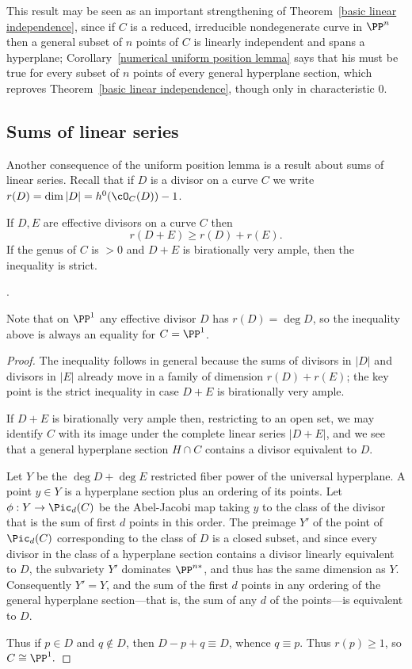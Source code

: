 This result may be seen as an important strengthening of Theorem~\ref{basic linear independence}, since if $C$ is a reduced, irreducible nondegenerate curve in $\PP^n$ then a general subset of $n$ points of $C$ is linearly independent and spans a hyperplane; Corollary~\ref{numerical uniform position lemma} says that his must
be true for every subset of $n$ points of every general hyperplane section, 
which reproves Theorem~\ref{basic linear independence}, though only in characteristic 0. 

\subsection{Sums of linear series}

Another consequence of the uniform position lemma is a result about sums of linear series.
Recall that if $D$ is a divisor on a curve $C$ we write $r(D) = \dim |D| = h^0(\cO_C(D))-1$.

\begin{corollary}\label{Clifford equality plus}
If $D,E$ are effective divisors on a curve $C$ then
$$
r(D+E) \geq r(D)+r(E).
$$
If the genus of $C$ is $>0$ and $D+E$ is birationally very ample, then the inequality is strict.
\end{corollary}.

Note that on $\PP^1$ any effective divisor $D$ has $r(D) = \deg D$, so the inequality above is
always an equality for $C = \PP^1$.

\begin{proof}
 The inequality follows in general because the sums of divisors in $|D|$ and divisors in $|E|$ already move in 
 a family of dimension $r(D)+r(E)$; the key point is the strict inequality in case $D+E$ is birationally very ample.
 
If $D+E$ is birationally very ample then, restricting to an open set,
we may identify $C$ with its image under the complete linear series $|D+E|$, and we see that a general hyperplane section $H\cap C$ contains a divisor equivalent to $D$.

Let $Y$ be the $\deg D +\deg E$ restricted fiber power of the universal hyperplane.
A point $y\in Y$ is a hyperplane section plus an ordering of its points.  Let $\phi: Y \to \Pic_d(C)$ be the Abel-Jacobi map taking $y$
 to the class of the divisor that is the sum of first $d$ points in this order. The preimage  $Y'$ of the point of $\Pic_d(C)$ corresponding to the class of $D$ is a closed subset, and
since every divisor in the class of a hyperplane section contains a divisor
linearly equivalent to  $D$, the subvariety $Y'$ dominates $\PP^{n*}$, and thus
has the same dimension as $Y$. Consequently $Y'=Y$, and the sum of the first $d$ points
in any ordering of the general hyperplane section---that is, the sum of any $d$
of the points---is equivalent to $D$.

Thus if $p\in D$ and $q\notin D$, then $D-p+q \equiv D$, whence $q\equiv p$. Thus
$r(p)\geq 1$, so $C\cong \PP^1.$
\end{proof}

